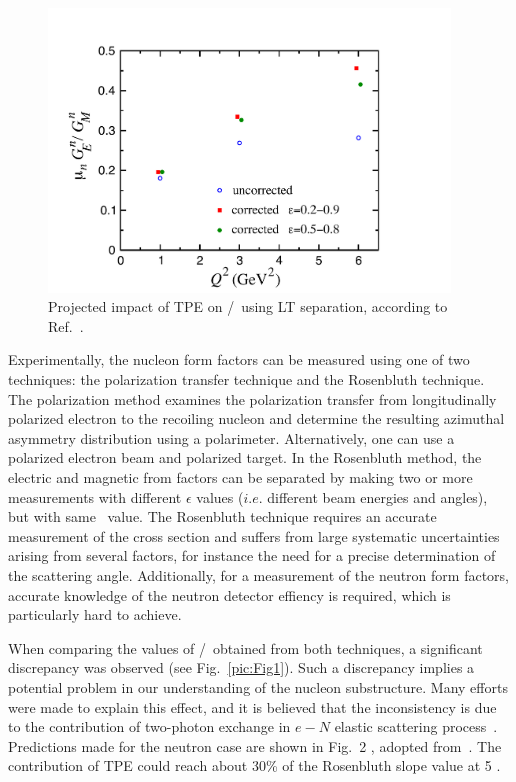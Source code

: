 \begin{figure}[th]
\includegraphics[width = 0.95\textwidth]{Plots/nTPE-BMT.pdf}
\caption{Projected impact of TPE on \gen/\gmn~using LT separation, according to Ref.~\cite{Blunden:2005ew}.}
\label{pic:Fig2}
\end{figure}
 
Experimentally, the nucleon form factors can be measured using one of two techniques: the polarization transfer technique and the Rosenbluth technique. 
The polarization method examines the polarization transfer from longitudinally polarized electron to the recoiling nucleon and 
determine the resulting azimuthal asymmetry distribution using a polarimeter. 
Alternatively, one can use a polarized electron beam and polarized target. 
In the Rosenbluth method, the electric and magnetic from factors can be separated by making two or more measurements with 
different $\epsilon$ values ($i.e.$ different beam energies and angles), but with same \qsq~value. 
The Rosenbluth technique requires an accurate measurement of the cross section and suffers from large systematic uncertainties arising from several factors, for instance
the need for a precise determination of the scattering angle. Additionally,
for a measurement of the neutron form factors, accurate knowledge of
the neutron detector effiency is required, which is particularly hard to
achieve.

When comparing the values of \gep/\gmp~obtained from both techniques, a significant discrepancy was observed (see Fig.~\ref{pic:Fig1}). 
Such a discrepancy implies a potential problem in our understanding of the nucleon substructure. 
Many efforts were made to explain this effect, and it is believed that the inconsistency is due to the contribution of two-photon exchange
in $e-N$ elastic scattering process~\cite{Arrington:2011dn, Afanasev:2017gsk}.
Predictions made for the neutron case are shown in Fig.~2
, adopted from~\cite{Blunden:2005ew}.
The contribution of TPE could reach about 30\% of the Rosenbluth slope value at 5 \gevcsq.

